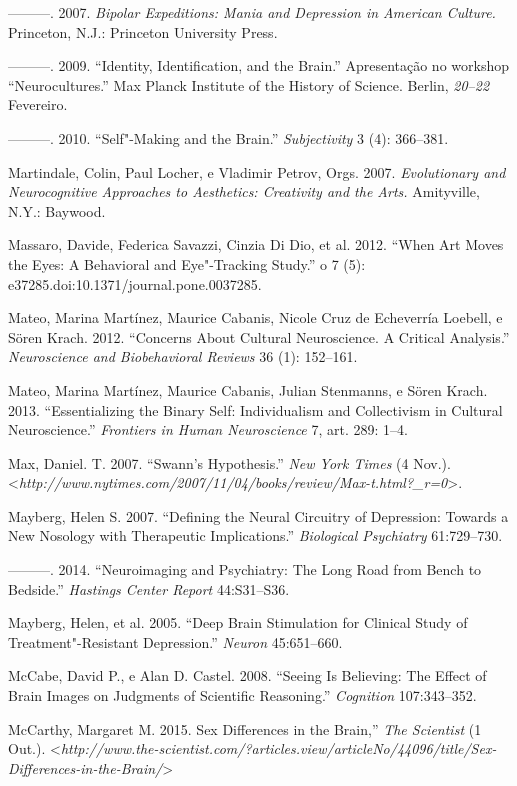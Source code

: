 ---------. 2007. \emph{Bipolar Expeditions: Mania and Depression in
American Culture.} Princeton, N.J.: Princeton University Press.

---------. 2009. ``Identity, Identification, and the Brain.''
Apresentação no workshop ``Neurocultures.'' Max Planck Institute of the
History of Science. Berlin, \emph{20--22} Fevereiro.

---------. 2010. ``Self"-Making and the Brain.'' \emph{Subjectivity} 3
(4): 366--381.

Martindale, Colin, Paul Locher, e Vladimir Petrov, Orgs. 2007.
\emph{Evolutionary and Neurocognitive Approaches to Aesthetics:
Creativity and the Arts.} Amityville, N.Y.: Baywood.

Massaro, Davide, Federica Savazzi, Cinzia Di Dio, et al. 2012. ``When
Art Moves the Eyes: A Behavioral and Eye"-Tracking Study.'' o 7
(5): e37285.doi:10.1371/journal.pone.0037285.

Mateo, Marina Martínez, Maurice Cabanis, Nicole Cruz de Echeverría
Loebell, e Sören Krach. 2012. ``Concerns About Cultural Neuroscience. A
Critical Analysis.'' \emph{Neuroscience and Biobehavioral Reviews} 36
(1): 152--161.

Mateo, Marina Martínez, Maurice Cabanis, Julian Stenmanns, e Sören
Krach. 2013. ``Essentializing the Binary Self: Individualism and
Collectivism in Cultural Neuroscience.'' \emph{Frontiers in Human
Neuroscience} 7, art. 289: 1--4.

Max, Daniel. T. 2007. ``Swann's Hypothesis.'' \emph{New York Times} (4
Nov.).
\textless{}\emph{http://www.nytimes.com/2007/11/04/books/review/Max-t.html?\_r​=0}\textgreater{}.

Mayberg, Helen S. 2007. ``Defining the Neural Circuitry of Depression:
Towards a New Nosology with Therapeutic Implications.'' \emph{Biological
Psychiatry} 61:729--730.

---------. 2014. ``Neuroimaging and Psychiatry: The Long Road from Bench
to Bedside.'' \emph{Hastings Center Report} 44:S31--S36.

Mayberg, Helen, et al. 2005. ``Deep Brain Stimulation for Clinical Study
of Treatment"-Resistant Depression.'' \emph{Neuron} 45:651--660.

McCabe, David P., e Alan D. Castel. 2008. ``Seeing Is Believing: The
Effect of Brain Images on Judgments of Scientific Reasoning.''
\emph{Cognition} 107:343--352.

McCarthy, Margaret M. 2015. Sex Differences in the Brain,'' \emph{The
Scientist} (1 Out.).
\textless{}\emph{http://www.the-scientist.com/?articles.view/articleNo/44096/title/Sex-Differences-in-the-Brain/}\textgreater{}

